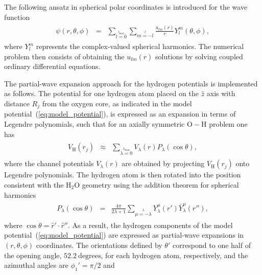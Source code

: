 The following ansatz in spherical polar coordinates is introduced for
the wave function
%
\begin{eqnarray}
  \begin{split}
    \psi(r,\theta,\phi) & = & \sum\limits_{l=0}\limits^{l_{\mathrm{max}}}
    \sum\limits_{m=-l}\limits^{l} \frac{u_{lm}(r)}{r}
    Y_{l}^{m}(\theta, \phi),
  \end{split}
  \label{eq:spherical_anzats}
\end{eqnarray}
%
where $Y_{l}^{m}$ represents the complex-valued spherical
harmonics. The numerical problem then consists of obtaining the
$u_{lm}(r)$ solutions by solving coupled ordinary differential
equations.

The partial-wave expansion approach for the hydrogen potentials is
implemented as follows. The potential for one hydrogen atom placed on
the $\hat{z}$ axis with distance $R_{j}$ from the oxygen core, as
indicated in the model potential~(\ref{eq:model_potential}), is
expressed as an expansion in terms of Legendre polynomials, such that
for an axially symmetric $\mathrm{O}-\mathrm{H}$ problem one
has~\cite{marko_partialwave}
%
\begin{eqnarray}
  \begin{split}
    V_{\mathrm{H}}(r_{j}) & \approx & \sum\limits_{\lambda=0}
    \limits^{\lambda_{\mathrm{max}}} V_{\lambda}(r) P_{\lambda}(\cos\theta),
  \end{split}
  \label{eq:Legendre-pols}
\end{eqnarray}
%
where the channel potentials $V_{\lambda}(r)$ are obtained by
projecting $V_{\mathrm{H}}(r_{j})$ onto Legendre polynomials. The
hydrogen atom is then rotated into the position consistent with the
H$_{2}$O geometry using the addition theorem for spherical harmonics
%
\begin{eqnarray}
  \begin{split}
    P_{\lambda}(\cos\theta) & = & \frac{4\pi}{2\lambda + 1}
    \sum\limits_{\mu = -\lambda}\limits^{\lambda} Y_{\lambda}^{\mu}(\hat{r}')
    \bar{Y}_{\lambda}^{\mu}(\hat{r}''),
  \end{split}
  \label{eq:add_sphericalYlm}
\end{eqnarray}
%
where $\cos\theta = \hat{r}'\cdot\hat{r}''$. As a result, the hydrogen
components of the model potential~(\ref{eq:model_potential}) are
expressed as partial-wave expansions in $(r,\theta,\phi)$
coordinates. The orientations defined by $\theta'$ correspond to one
half of the opening angle, $52.2\ \mathrm{degrees}$, for each hydrogen
atom, respectively, and the azimuthal angles are $\phi_{1}'=\pi/2$ and
